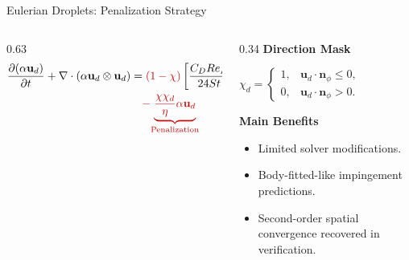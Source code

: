 \begin{frame}[t]{Eulerian Droplets: Penalization Strategy}
\begin{columns}[T,onlytextwidth]
\begin{column}{0.63\textwidth}
{\begin{align*}
\frac{\partial(\alpha\mathbf{u}_d)}{\partial t}
+\nabla\cdot(\alpha\mathbf{u}_d\otimes\mathbf{u}_d)
&=
\textcolor{red!80!black}{(1-\chi)}\left[
\frac{C_DRe_D}{24St}\alpha(\mathbf{u}_a-\mathbf{u}_d)
+\alpha\left(1-\frac{\rho_a}{\rho_d}\right)
\frac{\mathbf{g}}{Fr^2}
\right]
\\
&\quad\textcolor{red!80!black}{-}
\textcolor{red!80!black}{\underbrace{\frac{\chi\chi_d}{\eta}\alpha\mathbf{u}_d}_{\text{Penalization}}}
\end{align*}}
\end{column}
\hfill
\begin{column}{0.34\textwidth}
{\color{champsBlue}\bfseries Direction Mask}\par
\vspace{0.04cm}
{\centering\scriptsize$\chi_d=\begin{cases}1, & \mathbf{u}_d\cdot\mathbf{n}_{\phi}\leq 0,\\ 0, & \mathbf{u}_d\cdot\mathbf{n}_{\phi}>0.\end{cases}$\par}
\vspace{0.1cm}
{\color{champsBlue}\bfseries Main Benefits}\par
\vspace{0.02cm}
\begin{itemize}\footnotesize\setlength{\itemsep}{1pt}
  \item Limited solver modifications.
  \item Body-fitted-like impingement predictions.
  \item Second-order spatial convergence recovered in verification.
\end{itemize}
\end{column}
\end{columns}
\vfill
\begin{center}
\end{center}
\end{frame}

